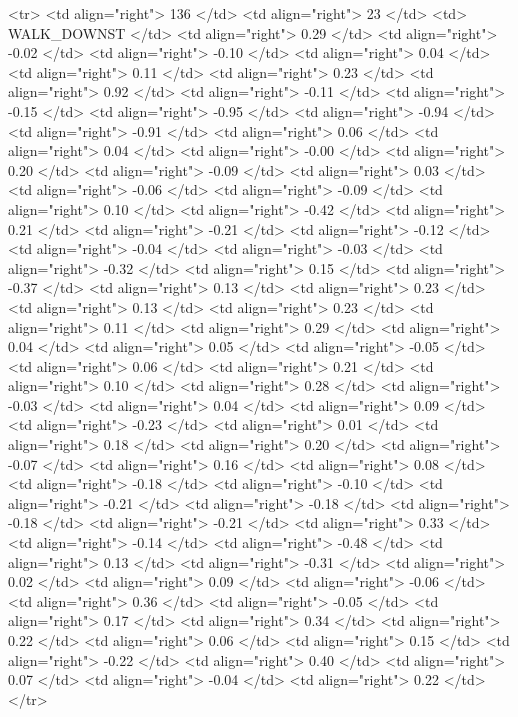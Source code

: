  <tr> <td align="right"> 136 </td> <td align="right">  23 </td> <td> WALK_DOWNST </td> <td align="right"> 0.29 </td> <td align="right"> -0.02 </td> <td align="right"> -0.10 </td> <td align="right"> 0.04 </td> <td align="right"> 0.11 </td> <td align="right"> 0.23 </td> <td align="right"> 0.92 </td> <td align="right"> -0.11 </td> <td align="right"> -0.15 </td> <td align="right"> -0.95 </td> <td align="right"> -0.94 </td> <td align="right"> -0.91 </td> <td align="right"> 0.06 </td> <td align="right"> 0.04 </td> <td align="right"> -0.00 </td> <td align="right"> 0.20 </td> <td align="right"> -0.09 </td> <td align="right"> 0.03 </td> <td align="right"> -0.06 </td> <td align="right"> -0.09 </td> <td align="right"> 0.10 </td> <td align="right"> -0.42 </td> <td align="right"> 0.21 </td> <td align="right"> -0.21 </td> <td align="right"> -0.12 </td> <td align="right"> -0.04 </td> <td align="right"> -0.03 </td> <td align="right"> -0.32 </td> <td align="right"> 0.15 </td> <td align="right"> -0.37 </td> <td align="right"> 0.13 </td> <td align="right"> 0.23 </td> <td align="right"> 0.13 </td> <td align="right"> 0.23 </td> <td align="right"> 0.11 </td> <td align="right"> 0.29 </td> <td align="right"> 0.04 </td> <td align="right"> 0.05 </td> <td align="right"> -0.05 </td> <td align="right"> 0.06 </td> <td align="right"> 0.21 </td> <td align="right"> 0.10 </td> <td align="right"> 0.28 </td> <td align="right"> -0.03 </td> <td align="right"> 0.04 </td> <td align="right"> 0.09 </td> <td align="right"> -0.23 </td> <td align="right"> 0.01 </td> <td align="right"> 0.18 </td> <td align="right"> 0.20 </td> <td align="right"> -0.07 </td> <td align="right"> 0.16 </td> <td align="right"> 0.08 </td> <td align="right"> -0.18 </td> <td align="right"> -0.10 </td> <td align="right"> -0.21 </td> <td align="right"> -0.18 </td> <td align="right"> -0.18 </td> <td align="right"> -0.21 </td> <td align="right"> 0.33 </td> <td align="right"> -0.14 </td> <td align="right"> -0.48 </td> <td align="right"> 0.13 </td> <td align="right"> -0.31 </td> <td align="right"> 0.02 </td> <td align="right"> 0.09 </td> <td align="right"> -0.06 </td> <td align="right"> 0.36 </td> <td align="right"> -0.05 </td> <td align="right"> 0.17 </td> <td align="right"> 0.34 </td> <td align="right"> 0.22 </td> <td align="right"> 0.06 </td> <td align="right"> 0.15 </td> <td align="right"> -0.22 </td> <td align="right"> 0.40 </td> <td align="right"> 0.07 </td> <td align="right"> -0.04 </td> <td align="right"> 0.22 </td> </tr>
